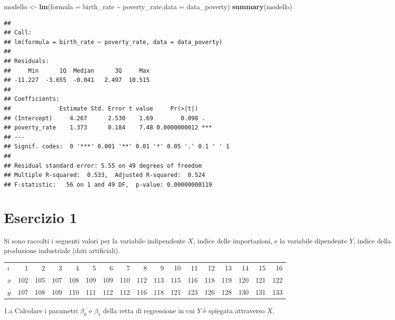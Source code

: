 \documentclass[
  11pt,
]{book}
\newenvironment{Shaded}{\begin{snugshade}}{\end{snugshade}}
\newcommand{\AttributeTok}[1]{\textcolor[rgb]{0.13,0.29,0.53}{#1}}
\newcommand{\FunctionTok}[1]{\textcolor[rgb]{0.13,0.29,0.53}{\textbf{#1}}}
\newcommand{\NormalTok}[1]{#1}
\newcommand{\OtherTok}[1]{\textcolor[rgb]{0.56,0.35,0.01}{#1}}
\newcommand{\SpecialCharTok}[1]{\textcolor[rgb]{0.81,0.36,0.00}{\textbf{#1}}}
\theoremstyle{mytheoremstyle}
\theoremstyle{mydefstyle}
\begin{document}
\begin{Shaded}
\begin{Highlighting}[]
\NormalTok{modello }\OtherTok{\textless{}{-}} \FunctionTok{lm}\NormalTok{(}\AttributeTok{formula =}\NormalTok{ birth\_rate }\SpecialCharTok{\textasciitilde{}}\NormalTok{ poverty\_rate,}\AttributeTok{data =}\NormalTok{ data\_poverty)}
\FunctionTok{summary}\NormalTok{(modello)}
\end{Highlighting}
\end{Shaded}

\begin{verbatim}
## 
## Call:
## lm(formula = birth_rate ~ poverty_rate, data = data_poverty)
## 
## Residuals:
##     Min      1Q  Median      3Q     Max 
## -11.227  -3.655  -0.041   2.497  10.515 
## 
## Coefficients:
##              Estimate Std. Error t value     Pr(>|t|)    
## (Intercept)     4.267      2.530    1.69        0.098 .  
## poverty_rate    1.373      0.184    7.48 0.0000000012 ***
## ---
## Signif. codes:  0 '***' 0.001 '**' 0.01 '*' 0.05 '.' 0.1 ' ' 1
## 
## Residual standard error: 5.55 on 49 degrees of freedom
## Multiple R-squared:  0.533,  Adjusted R-squared:  0.524 
## F-statistic:   56 on 1 and 49 DF,  p-value: 0.00000000119
\end{verbatim}

\section{Esercizio 1}\label{esercizio-1-2}

Si sono raccolti i seguenti valori per la variabile indipendente
\(X\), indice delle importazioni, e la variabile dipendente \(Y\),
indice della produzione industriale (dati artificiali).

\small
\begin{table}[H]
\centering
\begin{tabular}{lrrrrrrrrrrrrrrrr}
\toprule
$i$ & 1 & 2 & 3 & 4 & 5 & 6 & 7 & 8 & 9 & 10 & 11 & 12 & 13 & 14 & 15 & 16\\
$x$ & 102 & 105 & 107 & 108 & 109 & 109 & 110 & 112 & 113 & 115 & 116 & 118 & 119 & 120 & 121 & 122\\
$y$ & 107 & 108 & 109 & 110 & 111 & 112 & 112 & 116 & 118 & 121 & 123 & 126 & 128 & 130 & 131 & 133\\
\bottomrule
\end{tabular}
\end{table}
\normalsize

1.a Calcolare i parametri \(\beta_{0}\) e \(\beta_{1}\) della
retta di regressione in cui \(Y\) è spiegata attraverso \(X\).
\end{document}

